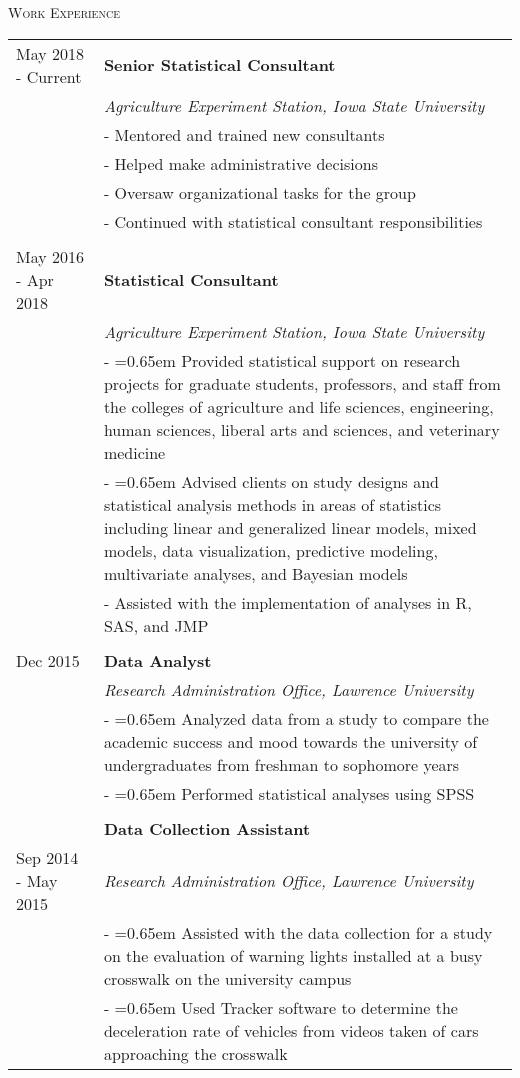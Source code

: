\documentclass[10pt, oneside]{article}
\begin{document}
\noindent \textsc{Work Experience} \hrulefill
\begin{longtable}{p{3.5cm}p{13cm}}
\hfill{May 2018 - Current} & \textbf{Senior Statistical Consultant}\\
& \emph{Agriculture Experiment Station, Iowa State University} \vspace{0.1cm}\\
& - Mentored and trained new consultants\\
& - Helped make administrative decisions\\
& - Oversaw organizational tasks for the group\\
& - Continued with statistical consultant responsibilities\\
\\
\hfill{May 2016 - Apr 2018} & \textbf{Statistical Consultant}\\
& \emph{Agriculture Experiment Station, Iowa State University} \vspace{0.1cm}\\
& - \hangindent=0.65em \hangafter=1 Provided statistical support on research projects for graduate students, professors, and staff from the colleges of agriculture and life sciences, engineering, human sciences, liberal arts and sciences, and veterinary medicine\\
& - \hangindent=0.65em \hangafter=1 Advised clients on study designs and statistical analysis methods in areas of statistics including linear and generalized linear models, mixed models, data visualization, predictive modeling, multivariate analyses, and Bayesian models\\
& - Assisted with the implementation of analyses in R, SAS, and JMP\\
\\
\hfill{Dec 2015} & \textbf{Data Analyst}\\
& \emph{Research Administration Office, Lawrence University} \vspace{0.1cm}\\
& - \hangindent=0.65em \hangafter=1 Analyzed data from a study to compare the academic success and mood towards the university of undergraduates from freshman to sophomore years\\
& - \hangindent=0.65em \hangafter=1 Performed statistical analyses using SPSS\\
\\
& \textbf{Data Collection Assistant}\\
\hfill{Sep 2014 - May 2015} & \emph{Research Administration Office, Lawrence University} \vspace{0.1cm}\\
& - \hangindent=0.65em \hangafter=1 Assisted with the data collection for a study on the evaluation of warning lights installed at a busy crosswalk on the university campus\\
& - \hangindent=0.65em \hangafter=1 Used Tracker software to determine the deceleration rate of vehicles from videos taken of cars approaching the crosswalk
\end{longtable}
\end{document}
